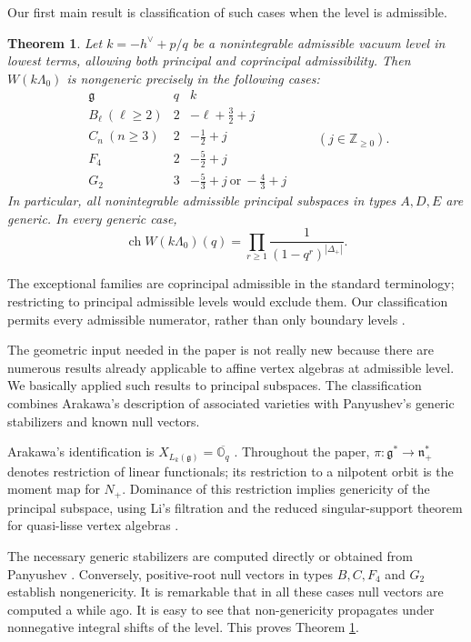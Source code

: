 \documentclass[11pt]{amsart}
\newtheorem{theorem}{Theorem}[section]
\theoremstyle{definition}
\theoremstyle{remark}
\newcommand{\Z}{\mathbb Z}
\newcommand{\g}{\mathfrak g}
\newcommand{\n}{\mathfrak n_+}
\DeclareMathOperator{\ch}{ch}
\begin{document}
Our first main result is classification of such cases when the level is admissible.
\begin{theorem}\label{thm:intro-classification}\label{thm:classification}
Let $k=-h^\vee+p/q$ be a nonintegrable admissible vacuum level in lowest
terms, allowing both principal and coprincipal admissibility. Then
$W(k\Lambda_0)$ is nongeneric precisely in the following cases:
\[
\begin{array}{c|c|l}
\g&q&k\\\hline
B_\ell\ (\ell\ge2)&2&-\ell+\frac32+j\\
C_n\ (n\ge3)&2&-\frac12+j\\
F_4&2&-\frac52+j\\
G_2&3&-\frac53+j\ \text{or}\ -\frac43+j
\end{array}
\qquad (j\in\Z_{\ge0}).
\]
In particular, all nonintegrable admissible principal subspaces in types
$A,D,E$ are generic. In every generic case,
\begin{equation}\label{eq:intro-generic-char}
 \ch W(k\Lambda_0)(q)=\prod_{r\ge1}\frac{1}{(1-q^r)^{|\Delta_+|}}.
\end{equation}
\end{theorem}

The exceptional families are coprincipal admissible in the standard
terminology; restricting to principal admissible levels would exclude
them. Our classification permits every admissible numerator, rather than
only boundary levels \cite{KW}.

The geometric input needed in the paper is not really new because there are numerous results already applicable
to affine vertex algebras at admissible level. We basically applied such results to principal subspaces.
The classification combines Arakawa's description of associated varieties with Panyushev's generic stabilizers and known null vectors.

 Arakawa's identification is
$X_{L_k(\g)}=\overline{\mathbb O_q}$ \cite{ArAssoc,AvEM}.
Throughout the paper, $\pi:\g^*\to\n^*$ denotes restriction of linear
functionals; its restriction to a nilpotent orbit is the moment map for
$N_+$. Dominance of this restriction implies genericity of the principal
subspace, using Li's filtration \cite{Li} and the reduced
singular-support theorem for quasi-lisse vertex algebras \cite{AMArc}.

The necessary generic stabilizers are computed directly or obtained from
Panyushev \cite{Pan}. Conversely, positive-root null vectors in types
$B,C,F_4$ \cite{PerseB,AMJoseph,PerseF} and $G_2$ \cite{AL} establish
nongenericity. It is remarkable that in all these cases null vectors are 
computed a while ago. It is easy to see that non-genericity propagates under
nonnegative integral shifts of the level. This proves Theorem \ref{thm:intro-classification}. 
\end{document}
